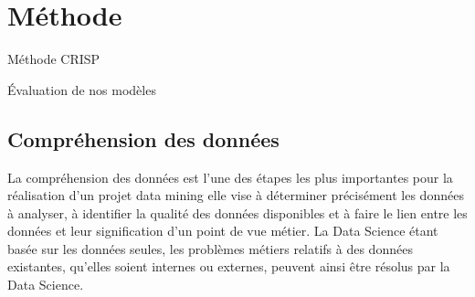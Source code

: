 \chapter{Méthode}

Méthode CRISP\cite{crisp}

Évaluation de nos modèles \cite{plasticc_team_2019_2539456}



\section{Compréhension des données}
La compréhension des données est l’une des étapes les plus importantes pour la réalisation d’un projet data mining elle vise à déterminer précisément les données à analyser, à identifier la qualité des données disponibles et à faire le lien entre les données
et leur signification d’un point de vue métier. La Data Science étant basée sur les données seules, les problèmes métiers relatifs à des données existantes, qu’elles soient internes ou externes, peuvent ainsi être résolus par la Data Science.

